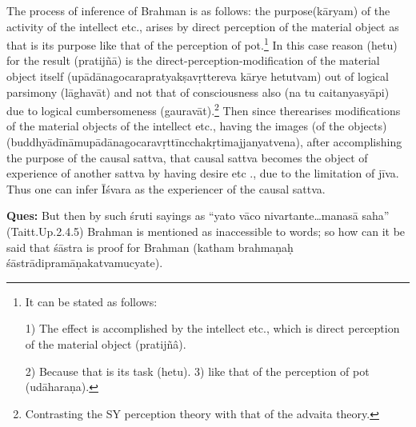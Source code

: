 

The process of inference of Brahman is as follows: the purpose\break (kāryam) of the activity of the intellect etc., arises by direct perception of the material object as that is its purpose like that of the perception of pot.\footnote{It can be stated as follows:

1) The effect is accomplished by the intellect etc., which is direct perception of the material object (pratijñâ).

2) Because that is its task (hetu). 3) like that of the perception of pot (udāharaṇa).} In this case reason (hetu) for the result (pratijñā) is the direct-perception-modification of the material object itself (upādānagocarapratyakṣavṛttereva kārye hetutvam) out of logical parsimony (lāghavāt) and not that of consciousness also (na tu caitanyasyā\-pi) due to logical cumbersomeness (gauravāt).\footnote{Contrasting the SY perception theory with that of the advaita theory.} Then since there\break arises modifications of the material objects of the intellect etc., having the images (of the objects) (buddhyādīnāmupādānagocaravṛttīncchakṛtimajjanyatvena), after accomplishing the purpose of the causal sattva, that causal sattva becomes the object of experience of another sattva by having desire etc ., due to the limitation of jīva. Thus one can infer Īśvara as the experiencer of the causal sattva.

\textbf{Ques:} But then by such śruti sayings as “yato vāco nivartante…manasā saha” (Taitt.Up.2.4.5) Brahman is mentioned as inaccessible to words; so how can it be said that  śāstra is proof for Brahman (katham brahmaṇaḥ śāstrādipramāṇakatvamucyate).


